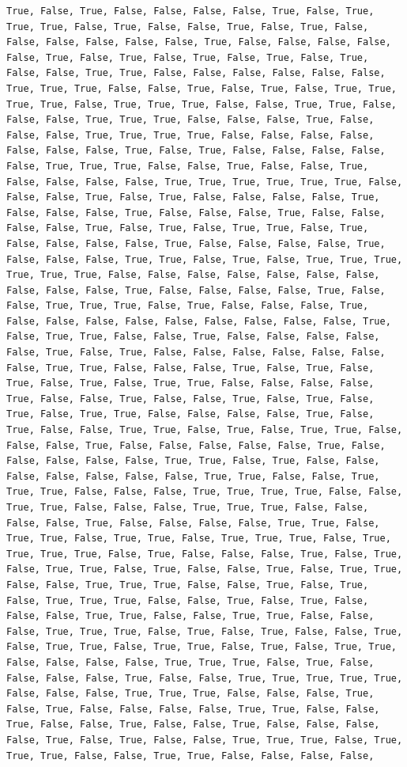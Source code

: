 \documentclass[
  letterpaper,
  DIV=11,
  numbers=noendperiod]{scrartcl}
\begin{document}
\begin{verbatim}
True, False, True, False, False, False, False, True, False, True, True, True, False, True, False, False, True, False, True, False, False, False, False, False, False, True, False, False, False, False, False, True, False, True, False, True, False, True, False, True, False, False, True, True, False, False, False, False, False, False, True, True, True, False, False, True, False, True, False, True, True, True, True, False, True, True, True, False, False, True, True, False, False, False, True, True, True, False, False, False, True, False, False, False, True, True, True, True, False, False, False, False, False, False, False, True, False, True, False, False, False, False, False, True, True, True, False, False, True, False, False, True, False, False, False, False, True, True, True, True, True, True, False, False, False, True, False, True, False, False, False, False, True, False, False, False, True, False, False, False, True, False, False, False, False, True, False, True, False, True, True, False, True, False, False, False, False, True, False, False, False, False, True, False, False, False, True, True, False, True, False, True, True, True, True, True, True, False, False, False, False, False, False, False, False, False, False, True, False, False, False, False, True, False, False, True, True, True, False, True, False, False, False, True, False, False, False, False, False, False, False, False, False, True, False, True, True, False, False, True, False, False, False, False, False, True, False, True, False, False, False, False, False, False, False, True, True, False, False, False, True, False, True, False, True, False, True, False, True, True, False, False, False, False, True, False, False, True, False, False, True, False, True, False, True, False, True, True, False, False, False, False, True, False, True, False, False, True, True, False, True, False, True, True, False, False, False, True, False, False, False, False, False, True, False, False, False, False, False, True, True, False, True, False, False, False, False, False, False, False, True, True, False, False, True, True, True, False, False, False, True, True, True, True, False, False, True, True, False, False, False, True, True, True, False, False, False, False, True, False, False, False, False, True, True, False, True, True, False, True, True, False, True, True, True, False, True, True, True, True, False, True, False, False, False, True, False, True, False, True, True, False, True, False, False, True, False, True, True, False, False, True, True, True, False, False, True, False, True, False, True, True, True, False, False, True, False, True, False, False, False, True, True, False, False, True, True, False, False, False, True, True, True, False, True, False, True, False, False, True, False, True, True, False, True, True, False, True, False, True, True, False, False, False, False, True, True, True, False, True, False, False, False, False, True, False, False, True, True, True, True, True, False, False, False, True, True, True, False, False, False, True, False, True, False, False, False, False, True, True, False, False, True, False, False, True, False, False, True, False, False, False, False, True, False, True, False, False, True, True, True, False, True, True, True, False, False, True, True, False, False, False, False, 
\end{verbatim}
\end{document}
